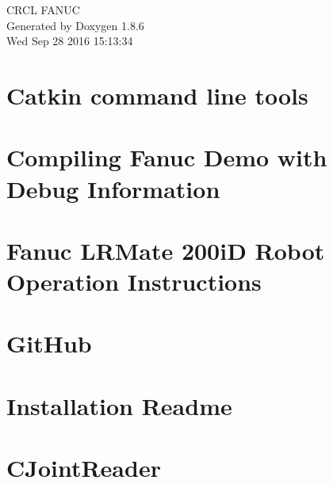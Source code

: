 \documentclass[twoside]{book}
\newcommand{\clearemptydoublepage}{%
  \newpage{\pagestyle{empty}\cleardoublepage}%
}
\begin{document}
\hypersetup{pageanchor=false}
\begin{titlepage}
\vspace*{7cm}
\begin{center}%
{\Large C\-R\-C\-L F\-A\-N\-U\-C }\\
\vspace*{1cm}
{\large Generated by Doxygen 1.8.6}\\
\vspace*{0.5cm}
{\small Wed Sep 28 2016 15:13:34}\\
\end{center}
\end{titlepage}
\clearemptydoublepage
\tableofcontents
\clearemptydoublepage
{}
\hypersetup{pageanchor=true}

\chapter{Catkin command line tools}
\label{md_markdown_catkin}
\hypertarget{md_markdown_catkin}{}

\chapter{Compiling Fanuc Demo with Debug Information}
\label{md_markdown_Catkin_make_tips}
\hypertarget{md_markdown_Catkin_make_tips}{}

\chapter{Fanuc L\-R\-Mate 200i\-D Robot Operation Instructions}
\label{md_markdown_FanucRobotOperationInstructions}
\hypertarget{md_markdown_FanucRobotOperationInstructions}{}

\chapter{Git\-Hub}
\label{md_markdown_githubnotes}
\hypertarget{md_markdown_githubnotes}{}

\chapter{Installation Readme}
\label{md_markdown_Installation}
\hypertarget{md_markdown_Installation}{}

\chapter{C\-Joint\-Reader}
\label{md_markdown_JointReader}
\hypertarget{md_markdown_JointReader}{}

\end{document}
